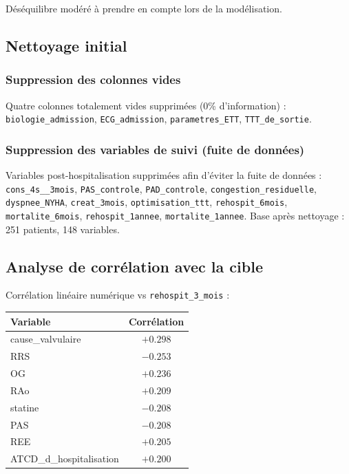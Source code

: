 \documentclass[12pt,a4paper]{report}
\begin{document}
Déséquilibre modéré à prendre en compte lors de la modélisation.

\subsection{Nettoyage initial}

\subsubsection{Suppression des colonnes vides}

Quatre colonnes totalement vides supprimées (0\% d'information) :
\texttt{biologie\_admission}, \texttt{ECG\_admission}, \texttt{parametres\_ETT},
\texttt{TTT\_de\_sortie}.

\subsubsection{Suppression des variables de suivi (fuite de données)}

Variables post-hospitalisation supprimées afin d'éviter la fuite de données :
\texttt{cons\_4s\_\_3mois}, \texttt{PAS\_controle}, \texttt{PAD\_controle},
\texttt{congestion\_residuelle}, \texttt{dyspnee\_NYHA}, \texttt{creat\_3mois},
\texttt{optimisation\_ttt}, \texttt{rehospit\_6mois}, \texttt{mortalite\_6mois},
\texttt{rehospit\_1annee}, \texttt{mortalite\_1annee}. Base après nettoyage : 251 patients,
148 variables.

\subsection{Analyse de corrélation avec la cible}

Corrélation linéaire numérique vs \texttt{rehospit\_3\_mois} :

\begin{center}
\renewcommand{\arraystretch}{1.2}
\begin{tabular}{@{}l c@{}}
\toprule
\textbf{Variable} & \textbf{Corrélation} \\
\midrule
cause\_valvulaire & $+0.298$ \\
RRS & $-0.253$ \\
OG & $+0.236$ \\
RAo & $+0.209$ \\
statine & $-0.208$ \\
PAS & $-0.208$ \\
REE & $+0.205$ \\
ATCD\_d\_hospitalisation & $+0.200$ \\
\bottomrule
\end{tabular}
\end{center}
\end{document}
